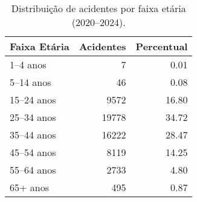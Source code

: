 \begin{table}
\caption{Distribuição de acidentes por faixa etária (2020–2024).}
\begin{tabular}{lrr}
\toprule
Faixa Etária & Acidentes & Percentual \\
\midrule
1–4 anos & 7 & 0.01 \\
5–14 anos & 46 & 0.08 \\
15–24 anos & 9572 & 16.80 \\
25–34 anos & 19778 & 34.72 \\
35–44 anos & 16222 & 28.47 \\
45–54 anos & 8119 & 14.25 \\
55–64 anos & 2733 & 4.80 \\
65+ anos & 495 & 0.87 \\
\bottomrule
\end{tabular}
\end{table}
